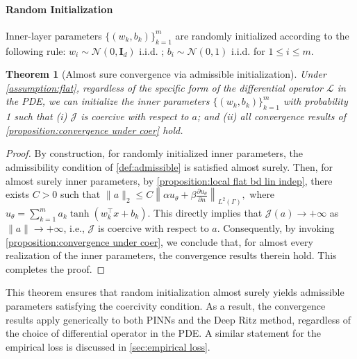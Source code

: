 \documentclass{article}
\newtheorem{theorem}{Theorem}
\begin{document}
\vspace{-.5em}
\paragraph{Random Initialization} Inner-layer parameters $\{(w_k,b_k)\}_{k=1}^{m}$ are randomly initialized according to the following rule:
 $w_{i}\sim \mathcal{N}(0,\mathbf{I}_d)$ i.i.d. ; $b_{i}\sim \mathcal{N}(0,1)$ i.i.d. for $1\le i\le m$.
 
\begin{theorem}[Almost sure convergence via admissible initialization]\label{theorem:convergence under flat}
Under \cref{assumption:flat}, regardless of the specific form of the differential operator $\mathcal{L}$ in the PDE, we can initialize the inner parameters $\{(w_k,b_k)\}_{k=1}^{m}$ with probability 1 such that 
(i)  $\mathcal{J}$ is coercive with respect to $a$; and 
(ii) all convergence results of \cref{proposition:convergence under coer} hold. %
\end{theorem}
\begin{proof}
By construction, for randomly initialized inner parameters, the admissibility condition of \cref{def:admissible} is satisfied almost surely. 
Then, for almost surely inner parameters, by \cref{proposition:local flat bd lin indep}, there exists $C > 0$ such that
$
    \|a\|_2 \leq C \left\| \alpha u_{\theta} + \beta \frac{\partial u_{\theta}}{\partial n} \right\|_{L^2(\Gamma)},
$
where $u_{\theta} = \sum_{k=1}^m a_k \tanh(w_k^\top x + b_k)$.
This directly implies that $\mathcal{J}(a)\to +\infty$ as $\|a\|\to +\infty$, i.e., $\mathcal{J}$ is coercive with respect to $a$.
Consequently, by invoking \cref{proposition:convergence under coer}, we conclude that, for almost every realization of the inner parameters, the convergence results therein hold. This completes the proof.
\end{proof}

This theorem ensures that random initialization almost surely yields admissible parameters satisfying the coercivity condition. 
As a result, the convergence results apply generically to both PINNs and the Deep Ritz method, regardless of the choice of differential operator in the PDE.
A similar statement for the empirical loss is discussed in \cref{sec:empirical loss}.
\end{document}
